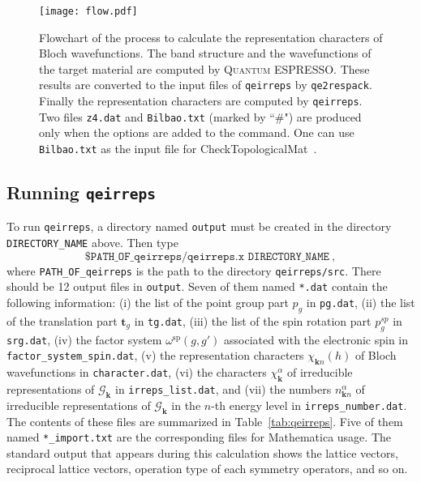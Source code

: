 \documentclass[3p,preprint]{elsarticle}
\newcommand{\mZ}{\mathbb{Z}}
\newcommand{\calGk}{\mathcal{G}_{\bm{k}}}
\newcommand{\qeirreps}{\texttt{qeirreps}}
\begin{document}
\begin{figure}[t]
	\begin{center}
		\texttt{[image: flow.pdf]}
		\caption{\label{fig:flow}Flowchart of the process to calculate the representation characters of Bloch wavefunctions. 
			The band structure and the wavefunctions of the target material are computed by \textsc{Quantum ESPRESSO}.
			These results are converted to the input files of \texttt{qeirreps} by \texttt{qe2respack}.	
			Finally the representation characters are computed by \texttt{qeirreps}.
			Two files \texttt{z4.dat} and \texttt{Bilbao.txt} (marked by ``\#") are produced only when the options are added to the command. One can use \texttt{Bilbao.txt} as the input file for CheckTopologicalMat~\cite{Vergniory2019}.}
	\end{center}
\end{figure}


\subsection{Running \texttt{qeirreps}}
\label{sub-sec:run}

To run \texttt{qeirreps}, a directory named \texttt{output} must be created in the directory \texttt{DIRECTORY\_NAME} above. Then type
\begin{equation*}
	\texttt{\$ PATH\_OF\_qeirreps/qeirreps.x DIRECTORY\_NAME}\ ,
\end{equation*}
where \texttt{PATH\_OF\_qeirreps} is the path to the directory \texttt{qeirreps/src}.  
There should be 12 output files in \texttt{output}. Seven of them named \texttt{*.dat} contain the following information: (i) the list of the point group part $p_g$ in \texttt{pg.dat}, (ii) the list of the translation part $\bm{t}_g$ in \texttt{tg.dat}, (iii) the list of the spin rotation part $p^{sp}_{g}$ in \texttt{srg.dat}, (iv) the factor system $\omega^{\text{sp}}(g,g')$ associated with the electronic spin in \texttt{factor\_system\_spin.dat}, (v) the representation characters $\chi_{\bm{k}n}(h)$ of Bloch wavefunctions in \texttt{character.dat}, (vi) the characters $\chi_{\bm{k}}^\alpha$ of irreducible representations of $\calGk$ in \texttt{irreps\_list.dat}, and (vii) the numbers $n_{\bm{k}n}^\alpha$ of irreducible representations of $\calGk$ in the $n$-th energy level in \texttt{irreps\_number.dat}. The contents of these files are summarized in Table~\ref{tab:qeirreps}.
Five of them named \texttt{*\_import.txt} are the corresponding files for Mathematica usage.
The standard output that appears during this calculation shows the lattice vectors, reciprocal lattice vectors, operation type of each symmetry operators, and so on. 
\end{document}
